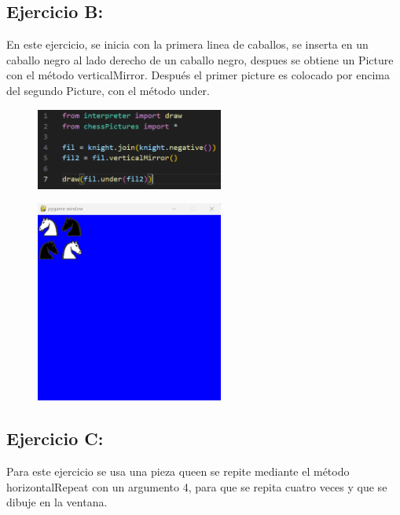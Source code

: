 \documentclass{article}
\begin{document}
	\subsection{Ejercicio B:}
	
	En este ejercicio, se inicia con la primera linea de caballos, se inserta en un caballo negro al lado derecho de un caballo negro, despues se obtiene un Picture con el método verticalMirror. Después el primer picture es colocado por encima del segundo Picture, con el método under.
	
	\begin{figure}[H]
		\centering
		\includegraphics[width=0.55\textwidth,keepaspectratio]{img/cap11.png}
	\end{figure}
	
	\begin{figure}[H]
		\centering
		\includegraphics[width=0.55\textwidth,keepaspectratio]{img/Picture B.png}
	\end{figure}	
	
	\subsection{Ejercicio C:}
	
	Para este ejercicio se usa una pieza queen se repite mediante el método horizontalRepeat con un argumento 4, para que se repita cuatro veces y que se dibuje en la ventana.
	
\end{document}
